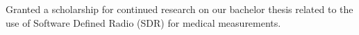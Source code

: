 Granted a scholarship for continued research on our bachelor thesis related to the use of Software Defined Radio (SDR) for medical measurements.